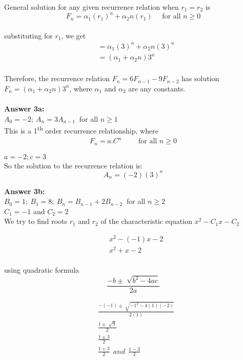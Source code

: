 \documentclass[12pt]{article}
\begin{document}
General solution for any given recurrence relation when $r_1 = r_2$ is\\

$$F_n = \alpha_1(r_1)^n + \alpha_2n(r_1) \text{~~~ for all $n \geq 0$}$$\\

substituting for $r_1$, we get
\begin{align*}
&= \alpha_1(3)^n + \alpha_2n(3)^n\\[7pt]
&= (\alpha_1 + \alpha_2n)3^n\\
\end{align*}

Therefore, the recurrence relation $F_n = 6F_{n-1} - 9F_{n-2} $ has solution $F_n = (\alpha_1 + \alpha_2n)3^n $, where $\alpha_1$ and $\alpha_2$ are any constants.\\\\

\textbf{Answer 3a:}\\

$A_0 = -2;~A_n = 3A_{n-1} ~$ for all $n \geq 1$\\

This is a 1\textsuperscript{th} order recurrence relationship, where\\
\begin{align*}
F_n = a . C^n \text{~~~~~~ for all $n \geq 0$}
\end{align*}

$a = -2; c = 3$\\

So the solution to the recurrence relation is:
$$A_n = (-2)(3)^n $$



\textbf{Answer 3b:}\\

$B_0 = 1;~B_1 = 8;~B_n = B_{n-1} + 2B_{n-2}~$ for all $n \geq 2$\\

$C_1 = -1$ and $C_2 = 2$\\

We try to find roots $r_1$ and $r_2$ of the characteristic equation $x^2 - C_1x - C_2$

\begin{align*}
&x^2 - (-1)x - 2\\
&x^2 + x - 2\\
\end{align*}

using quadratic formula $$ \frac{-b \pm  \sqrt[]{b^2 - 4ac}}{2a}$$

\begin{align*}
& \frac{-(-1)\pm  \sqrt[]{{-1}^2 - 4(1)(-2)}}{2(1)}\\[7pt]
&\frac{1\pm  \sqrt[]{9}}{2}\\[7pt]
&\frac{1\pm 3}{2}\\[7pt]
&\frac{1 + 3}{2} ~~ and ~~ \frac{1 - 3}{2} 
\end{align*}
\end{document}
